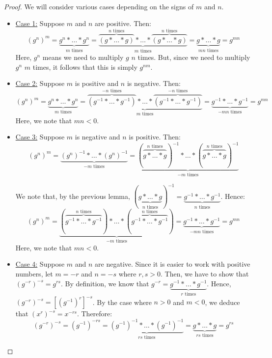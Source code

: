\documentclass[letterpaper]{article}
\begin{document}
\begin{mdframed}
    \begin{proof}
        We will consider various cases depending on the signs of $m$ and $n$. 
        \begin{itemize}
            \item \underline{Case 1:} Suppose $m$ and $n$ are positive. Then: 
            \[(g^n)^m = \underbrace{g^n * \dots * g^n}_{m \text{ times}} = \underbrace{\overbrace{(g * \dots * g)}^{n \text{ times}} * \dots * \overbrace{(g * \dots * g)}^{n \text{ times}}}_{m \text{ times}} = \underbrace{g * \dots * g}_{mn \text{ times}} = g^{mn}\]
            Here, $g^n$ means we need to multiply $g$ $n$ times. But, since we need to multiply $g^n$ $m$ times, it follows that this is simply $g^{nm}$.  

            \item \underline{Case 2:} Suppose $m$ is positive and $n$ is negative. Then: 
            \[(g^n)^m = \underbrace{g^n * \dots * g^n}_{m \text{ times}} = \underbrace{\overbrace{(g^{-1} * \dots * g^{-1})}^{-n \text{ times}} * \dots * \overbrace{(g^{-1} * \dots * g^{-1})}^{-n \text{ times}}}_{m \text{ times}} = \underbrace{g^{-1} * \dots * g^{-1}}_{-mn \text{ times}} = g^{mn}\]
            Here, we note that $mn < 0$. 

            \item \underline{Case 3:} Suppose $m$ is negative and $n$ is positive. Then: 
            \[(g^n)^m = \underbrace{(g^n)^{-1} * \dots * (g^n)^{-1}}_{-m \text{ times}} = \underbrace{(\overbrace{g * \dots * g}^{n \text{ times}})^{-1} * \dots * (\overbrace{g * \dots * g}^{n \text{ times}})^{-1}}_{-m \text{ times}}\]

            We note that, by the previous lemma, $(\underbrace{g * \dots * g}_{n \text{ times}})^{-1} = \underbrace{g^{-1} * \dots * g^{-1}}_{n \text{ times}}$. Hence: 
            \[(g^n)^m = \underbrace{(\overbrace{g^{-1} * \dots * g^{-1}}^{n \text{ times}}) * \dots * (\overbrace{g^{-1} * \dots * g^{-1}}^{n \text{ times}})}_{-m \text{ times}} = \underbrace{g^{-1} * \dots * g^{-1}}_{-mn \text{ times}} = g^{mn}\]
            Here, we note that $mn < 0$.  

            \item \underline{Case 4:} Suppose $m$ and $n$ are negative. Since it is easier to work with positive numbers, let $m = -r$ and $n = -s$ where $r, s > 0$. Then, we have to show that $(g^{-r})^{-s} = g^{rs}$. By definition, we know that $g^{-r} = \underbrace{g^{-1} * \dots * g^{-1}}_{r \text{ times}}$. Hence, $(g^{-r})^{-s} = [(g^{-1})^r]^{-s}$. By the case where $n > 0$ and $m < 0$, we deduce that $(x^r)^{-s} = x^{-rs}$. Therefore: 
            \[(g^{-r})^{-s} = (g^{-1})^{-rs} = \underbrace{(g^{-1})^{-1} * \dots * (g^{-1})^{-1}}_{rs \text{ times}} = \underbrace{g * \dots * g}_{rs \text{ times}} = g^{rs}\]


\end{itemize}
\end{proof}
\end{mdframed}
\end{document}
